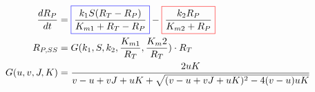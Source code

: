 \documentclass[preview]{standalone}
\begin{document}
\pagestyle{empty}
\begin{equation*}
\begin{aligned}
	\frac{dR_P}{dt} & = {\color{blue}\boxed{\color{black} \frac{k_1 S (R_T - R_P)}{K_{m1} + R_T -R_P}}} - \color{red}{\boxed{\color{black} \frac{k_2 R_P}{K_{m2}+R_P}}} \\ 
	R_{P, SS} & = G(k_1, S, k_2, \frac{K_{m1}}{R_T}, \frac{K_m2}{R_T}) \cdot R_T \\
	G(u, v, J, K) & = \frac{2uK}{v - u + vJ + uK + \sqrt{(v - u + vJ + uK)^2 - 4(v - u)uK}}
\end{aligned}
\end{equation*}
\vfill
\end{document}
